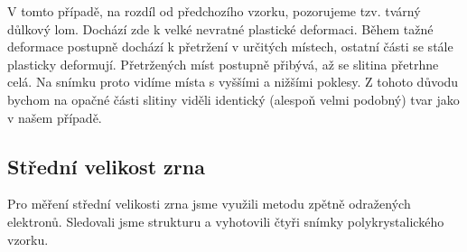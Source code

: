 V tomto případě, na rozdíl od předchozího vzorku, pozorujeme tzv. tvárný důlkový lom. Dochází zde k velké nevratné plastické deformaci. Během tažné deformace postupně dochází k přetržení v určitých místech, ostatní části se stále plasticky deformují. Přetržených míst postupně přibývá, až se slitina přetrhne celá. Na snímku proto vidíme místa s vyššími a nižšími poklesy. Z tohoto důvodu bychom na opačné části slitiny viděli identický (alespoň velmi podobný) tvar jako v našem případě.

\subsection{Střední velikost zrna}

Pro měření střední velikosti zrna jsme využili metodu zpětně odražených elektronů. Sledovali jsme strukturu a vyhotovili čtyři snímky polykrystalického vzorku.


